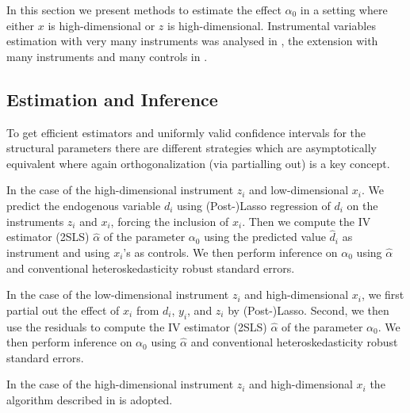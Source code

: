 \documentclass{amsart}\usepackage[]{graphicx}\usepackage[]{color}
\begin{document}
In this section we present methods to estimate the effect $\alpha_0$ in a setting where either $x$ is high-dimensional or $z$ is high-dimensional. Instrumental variables estimation with very many instruments was analysed in \citet{BCCH12}, the extension with many instruments and many controls in \citet{CHS:ManyIVNote}.

\subsection{Estimation and Inference}

To get efficient estimators and uniformly valid confidence intervals for the structural parameters there are different strategies which are asymptotically equivalent where again orthogonalization (via partialling out) is a key concept.

In the case of the high-dimensional instrument $z_i$
and low-dimensional $x_i$. We predict the endogenous variable $d_i$ using (Post-)Lasso regression of $d_i$ on the instruments $z_i$ and $x_i$, forcing the inclusion of $x_i$. Then we compute the IV estimator (2SLS) $\hat \alpha$ of the parameter $\alpha_0$ using the predicted value $\hat d_i$ as instrument and using $x_i$'s as controls.   We then perform inference on $\alpha_0$ using $\hat \alpha$ and conventional heteroskedasticity robust standard errors.

In the case of the low-dimensional instrument $z_i$
and high-dimensional $x_i$, we first partial out the effect of $x_i$ from $d_i$, $y_i$, and $z_i$ by (Post-)Lasso. Second, we then use the residuals to compute the IV estimator (2SLS) $\hat \alpha$ of the parameter $\alpha_0$. We then perform inference on $\alpha_0$ using $\hat \alpha$ and conventional heteroskedasticity robust standard errors.

In the case of the high-dimensional instrument $z_i$
and high-dimensional $x_i$ the algorithm described in \citet{CHS:ManyIVNote} is adopted. 

\end{document}
